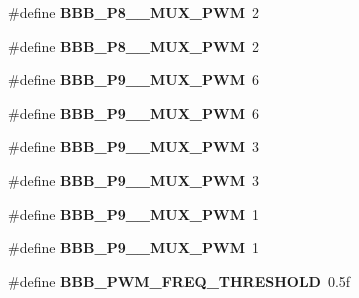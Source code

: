 \begin{DoxyCompactItemize}
\#define {\bfseries B\+B\+B\+\_\+\+P8\+\_\+\_\+\+M\+U\+X\+\_\+\+P\+WM}~2
\item 
\mbox{\label{bbb-pwm_8h_a845a940efda37307ca0275cd62d5ba90}} 
\#define {\bfseries B\+B\+B\+\_\+\+P8\+\_\+\_\+\+M\+U\+X\+\_\+\+P\+WM}~2
\item 
\mbox{\label{bbb-pwm_8h_a0e44b2579f4500148ce16c182286bcc6}} 
\#define {\bfseries B\+B\+B\+\_\+\+P9\+\_\+\_\+\+M\+U\+X\+\_\+\+P\+WM}~6
\item 
\mbox{\label{bbb-pwm_8h_a99a9101c3075c5ffe6279e46882ed235}} 
\#define {\bfseries B\+B\+B\+\_\+\+P9\+\_\+\_\+\+M\+U\+X\+\_\+\+P\+WM}~6
\item 
\mbox{\label{bbb-pwm_8h_a91f02dc3dc57887fd07771ae322426a8}} 
\#define {\bfseries B\+B\+B\+\_\+\+P9\+\_\+\_\+\+M\+U\+X\+\_\+\+P\+WM}~3
\item 
\mbox{\label{bbb-pwm_8h_a840697c300a18c3e64ecb526dba6a949}} 
\#define {\bfseries B\+B\+B\+\_\+\+P9\+\_\+\_\+\+M\+U\+X\+\_\+\+P\+WM}~3
\item 
\mbox{\label{bbb-pwm_8h_a90af0a7e549a51099c3a3747a128ff01}} 
\#define {\bfseries B\+B\+B\+\_\+\+P9\+\_\+\_\+\+M\+U\+X\+\_\+\+P\+WM}~1
\item 
\mbox{\label{bbb-pwm_8h_a61846a9cc6bc6131b4cee9ada8795dd6}} 
\#define {\bfseries B\+B\+B\+\_\+\+P9\+\_\+\_\+\+M\+U\+X\+\_\+\+P\+WM}~1
\item 
\mbox{\label{bbb-pwm_8h_a6babf0dcdf981427e20ece35c4b7ff2d}} 
\#define {\bfseries B\+B\+B\+\_\+\+P\+W\+M\+\_\+\+F\+R\+E\+Q\+\_\+\+T\+H\+R\+E\+S\+H\+O\+LD}~0.\+5f
\end{DoxyCompactItemize}
